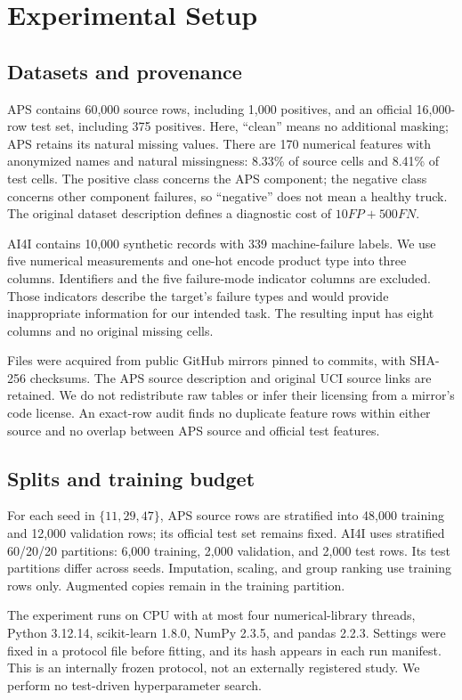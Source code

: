 \documentclass[conference]{IEEEtran}
\begin{document}
\section{Experimental Setup}
\subsection{Datasets and provenance}
APS \cite{apsdata} contains 60,000 source rows, including 1,000 positives, and an official 16,000-row test set, including 375 positives. Here, ``clean'' means no additional masking; APS retains its natural missing values. There are 170 numerical features with anonymized names and natural missingness: 8.33\% of source cells and 8.41\% of test cells. The positive class concerns the APS component; the negative class concerns other component failures, so ``negative'' does not mean a healthy truck. The original dataset description defines a diagnostic cost of $10FP+500FN$.

AI4I \cite{ai4idata} contains 10,000 synthetic records with 339 machine-failure labels. We use five numerical measurements and one-hot encode product type into three columns. Identifiers and the five failure-mode indicator columns are excluded. Those indicators describe the target's failure types and would provide inappropriate information for our intended task. The resulting input has eight columns and no original missing cells.

Files were acquired from public GitHub mirrors pinned to commits, with SHA-256 checksums. The APS source description and original UCI source links are retained. We do not redistribute raw tables or infer their licensing from a mirror's code license. An exact-row audit finds no duplicate feature rows within either source and no overlap between APS source and official test features.

\subsection{Splits and training budget}
For each seed in $\{11,29,47\}$, APS source rows are stratified into 48,000 training and 12,000 validation rows; its official test set remains fixed. AI4I uses stratified 60/20/20 partitions: 6,000 training, 2,000 validation, and 2,000 test rows. Its test partitions differ across seeds. Imputation, scaling, and group ranking use training rows only. Augmented copies remain in the training partition.

The experiment runs on CPU with at most four numerical-library threads, Python 3.12.14, scikit-learn 1.8.0, NumPy 2.3.5, and pandas 2.2.3. Settings were fixed in a protocol file before fitting, and its hash appears in each run manifest. This is an internally frozen protocol, not an externally registered study. We perform no test-driven hyperparameter search.
\end{document}
